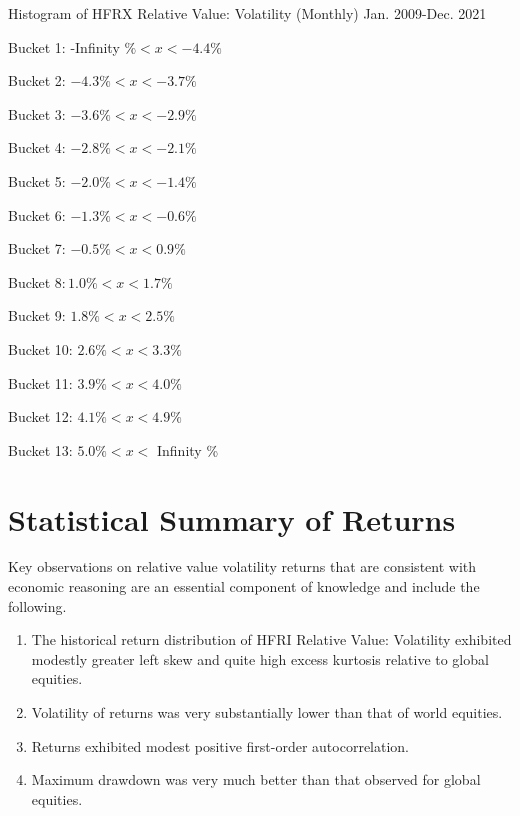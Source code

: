 \documentclass[11pt]{article}
\begin{document}
Histogram of HFRX Relative Value: Volatility (Monthly) Jan. 2009-Dec. 2021

Bucket 1: -Infinity $\%<x<-4.4 \%$

Bucket 2: $-4.3 \%<x<-3.7 \%$

Bucket 3: $-3.6 \%<x<-2.9 \%$

Bucket 4: $-2.8 \%<x<-2.1 \%$

Bucket 5: $-2.0 \%<x<-1.4 \%$

Bucket 6: $-1.3 \%<x<-0.6 \%$

Bucket 7: $-0.5 \%<x<0.9 \%$

Bucket $8: 1.0 \%<x<1.7 \%$

Bucket 9: $1.8 \%<x<2.5 \%$

Bucket 10: $2.6 \%<x<3.3 \%$

Bucket 11: $3.9 \%<x<4.0 \%$

Bucket 12: $4.1 \%<x<4.9 \%$

Bucket 13: $5.0 \%<x<$ Infinity \%

\section*{Statistical Summary of Returns}
Key observations on relative value volatility returns that are consistent with economic reasoning are an essential component of knowledge and include the following.

\begin{enumerate}
  \item The historical return distribution of HFRI Relative Value: Volatility exhibited modestly greater left skew and quite high excess kurtosis relative to global equities.

  \item Volatility of returns was very substantially lower than that of world equities.

  \item Returns exhibited modest positive first-order autocorrelation.

  \item Maximum drawdown was very much better than that observed for global equities.

\end{enumerate}
\end{document}
